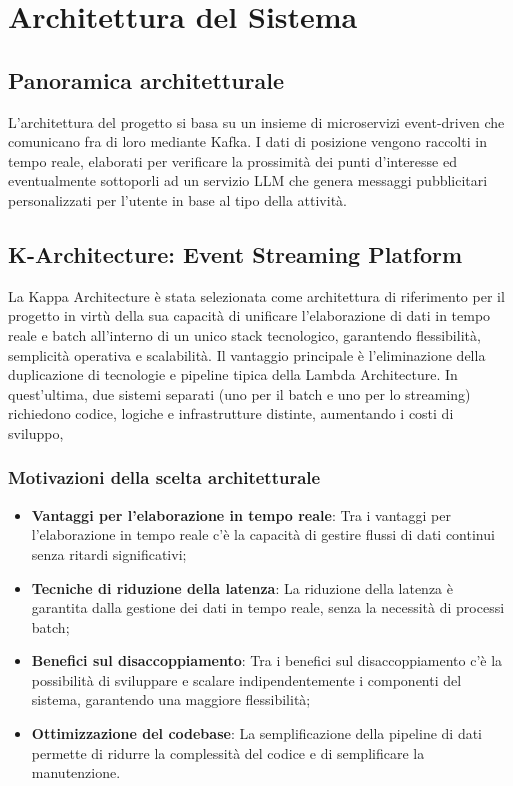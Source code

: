 \documentclass[10pt]{article}
\begin{document}
\newpage
\section{Architettura del Sistema}

\subsection{Panoramica architetturale}
L'architettura del progetto si basa su un insieme di microservizi event-driven che comunicano fra di loro mediante Kafka. I dati di posizione vengono raccolti in tempo reale, elaborati per verificare la prossimità dei punti d'interesse ed eventualmente sottoporli ad un servizio LLM che genera messaggi pubblicitari personalizzati per l'utente in base al tipo della attività.

\subsection{K-Architecture: Event Streaming Platform}
La Kappa Architecture è stata selezionata come architettura di riferimento per il progetto in virtù della sua capacità di unificare l’elaborazione di dati in tempo reale e batch all’interno di un unico stack tecnologico, garantendo flessibilità, semplicità operativa e scalabilità. Il vantaggio principale è l’eliminazione della duplicazione di tecnologie e pipeline tipica della Lambda Architecture. In quest’ultima, due sistemi separati (uno per il batch e uno per lo streaming) richiedono codice, logiche e infrastrutture distinte, aumentando i costi di sviluppo,
    \subsubsection{Motivazioni della scelta architetturale}
        \begin{itemize}
        \item \textbf{Vantaggi per l'elaborazione in tempo reale}: Tra i vantaggi per l'elaborazione in tempo reale c'è la capacità di gestire flussi di dati continui senza ritardi significativi;
        \item \textbf{Tecniche di riduzione della latenza}: La riduzione della latenza è garantita dalla gestione dei dati in tempo reale, senza la necessità di processi batch;
        \item \textbf{Benefici sul disaccoppiamento}: Tra i benefici sul disaccoppiamento c'è la possibilità di sviluppare e scalare indipendentemente i componenti del sistema, garantendo una maggiore flessibilità;
        \item \textbf{Ottimizzazione del codebase}: La semplificazione della pipeline di dati permette di ridurre la complessità del codice e di semplificare la manutenzione.
    \end{itemize}
\end{document}
